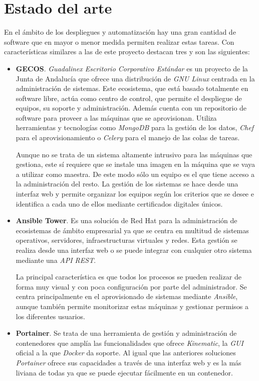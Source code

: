 \chapter{Estado del arte}

En el ámbito de los despliegues y automatización hay una gran cantidad de software que en mayor o menor medida permiten realizar estas tareas. Con características similares a las de este proyecto destacan tres y son las siguientes:

\begin{itemize}
	\item \textbf{GECOS}. \textit{Guadalinex Escritorio Corporativo Estándar} es un proyecto de la Junta de Andalucía que ofrece una distribución de \textit{GNU Linux} centrada en la administración de sistemas. Este ecosistema, que está basado totalmente en software libre, actúa como centro de control, que permite el despliegue de equipos, su soporte y administración. Además cuenta con un repositorio de software para proveer a las máquinas que se aprovisionan. Utiliza herramientas y tecnologías como \textit{MongoDB} para la gestión de los datos, \textit{Chef} para el aprovisionamiento o \textit{Celery} para el manejo de las colas de tareas.
	
	Aunque no se trata de un sistema altamente intrusivo para las máquinas que gestiona, este sí requiere que se instale una imagen en la máquina que se vaya a utilizar como maestra. De este modo sólo un equipo es el que tiene acceso a la administración del resto. La gestión de los sistemas se hace desde una interfaz web y permite organizar los equipos según los criterios que se desee e identifica a cada uno de ellos mediante certificados digitales únicos.
		
	\item \textbf{Ansible Tower}. Es una solución de Red Hat para la administración de ecosistemas de ámbito empresarial ya que se centra en multitud de sistemas operativos, servidores, infraestructuras virtuales y redes. Esta gestión se realiza desde una interfaz web o se puede integrar con cualquier otro sistema mediante una \textit{API REST}.
	
	La principal característica es que todos los procesos se pueden realizar de forma muy visual y con poca configuración por parte del administrador. Se centra principalmente en el aprovisionado de sistemas mediante \textit{Ansible}, aunque también permite monitorizar estas máquinas y gestionar permisos a los diferentes usuarios.
		
	\item \textbf{Portainer}. Se trata de una herramienta de gestión y administración de contenedores que amplía las funcionalidades que ofrece \textit{Kinematic}, la \textit{GUI} oficial a la que \textit{Docker} da soporte. Al igual que las anteriores soluciones \textit{Portainer} ofrece sus capacidades a través de una interfaz web y es la más liviana de todas ya que se puede ejecutar fácilmente en un contenedor.
	

\end{itemize}
